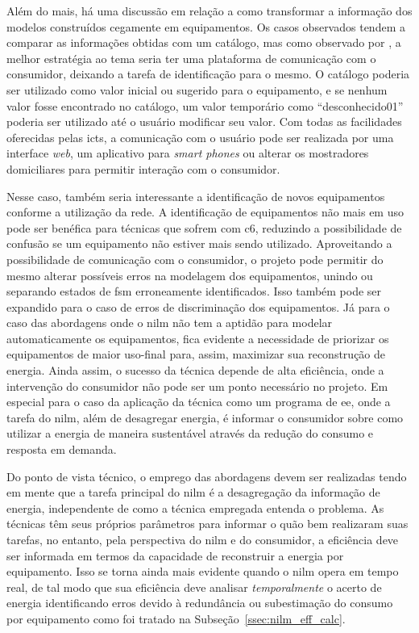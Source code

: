 Além do mais, há uma discussão em relação a como transformar a
informação dos modelos construídos cegamente em equipamentos. Os casos
observados \cite{nilm_hart_1992_8,nilm_bergman_distribuido_2011,
nilm_zeifman_vastext_approach_2012} tendem a comparar as informações
obtidas com um catálogo, mas como observado por
\cite{nilm_matthews_overview_2008_22}, a melhor estratégia ao tema
seria ter uma plataforma de comunicação com o consumidor, deixando a
tarefa de identificação para o mesmo. O catálogo poderia ser utilizado
como valor inicial ou sugerido para o equipamento, e se nenhum valor
fosse encontrado no catálogo, um valor temporário como
``desconhecido01'' poderia ser utilizado até o usuário modificar seu
valor. Com todas as facilidades oferecidas pelas \glspl{ict}, a
comunicação com o usuário pode ser realizada por uma interface
\emph{web}, um aplicativo para \emph{smart phones} ou alterar os
mostradores domiciliares para permitir interação com o consumidor.

Nesse caso, também seria interessante a identificação de novos
equipamentos conforme a utilização da rede. A identificação de equipamentos
não mais em uso pode ser benéfica para técnicas que sofrem com
\gls{c6}, reduzindo a possibilidade de confusão se um equipamento não
estiver mais sendo utilizado. Aproveitando a possibilidade de
comunicação com o consumidor, o projeto pode permitir do mesmo
alterar possíveis erros na modelagem dos equipamentos, unindo ou
separando estados de \gls{fsm} erroneamente identificados. Isso também
pode ser expandido para o caso de erros de discriminação dos
equipamentos. Já para o caso das abordagens onde o \gls{nilm} não tem a
aptidão para modelar automaticamente os equipamentos, fica evidente a
necessidade de priorizar os equipamentos de maior uso-final para, assim,
maximizar sua reconstrução de energia. Ainda assim, o sucesso da
técnica depende de alta eficiência, onde a intervenção do consumidor
não pode ser um ponto necessário no projeto. Em especial para o caso
da aplicação da técnica como um programa de \gls{ee}, onde a tarefa do
\gls{nilm}, além de desagregar energia, é informar o consumidor sobre
como utilizar a energia de maneira sustentável através da redução do
consumo e resposta em demanda.

Do ponto de vista técnico, o emprego das abordagens devem ser
realizadas tendo em mente que a tarefa principal do \gls{nilm}
é a desagregação da informação de energia, independente de como a
técnica empregada entenda o problema. As técnicas têm seus próprios parâmetros
para informar o quão bem realizaram suas tarefas, no entanto, pela perspectiva
do \gls{nilm} e do consumidor, a eficiência deve ser informada em termos da
capacidade de reconstruir a energia por equipamento. Isso se torna ainda mais
evidente quando o \gls{nilm} opera em tempo real, de tal modo que sua
eficiência deve analisar \emph{temporalmente} o acerto de energia identificando
erros devido à redundância ou subestimação do consumo por equipamento como foi
tratado na Subseção~\ref{ssec:nilm_eff_calc}.


